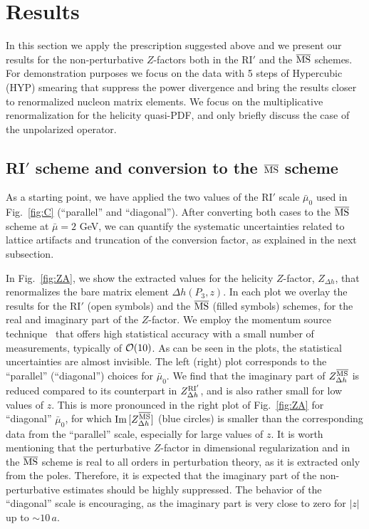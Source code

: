 \section{Results}
\label{Sec3}

In this section we apply the prescription suggested above and we present our results for the non-perturbative $Z$-factors
both in the RI$'$ and the ${\overline{\rm MS}}$ schemes. For demonstration purposes we focus on the data with 5 steps of Hypercubic (HYP) smearing that suppress
the power divergence and bring the results closer to renormalized nucleon matrix elements. We focus on the multiplicative renormalization
for the helicity quasi-PDF, and only briefly discuss the case of the unpolarized operator.

\subsection{RI$'$ scheme and conversion to the ${\overline{\rm MS}}$ scheme}

As a starting point, we have applied the two values of the RI$'$ scale $\bar\mu_0$
used in Fig.~\ref{fig:C} (``parallel'' and ``diagonal''). After converting both cases to the ${\overline{\rm MS}}$ scheme at $\bar\mu{=}2$ GeV,
we can quantify the systematic uncertainties related to lattice artifacts and truncation of the conversion factor, as explained in the next subsection.

In Fig.~\ref{fig:ZA}, we show the extracted values for the helicity $Z$-factor, $Z_{\Delta h}$, that renormalizes the bare matrix element
$\Delta h(P_3,z)$. In each plot we overlay the results for the RI$'$ (open symbols) and the ${\overline{\rm MS}}$ (filled symbols) schemes,
for the real and imaginary part of the $Z$-factor. We employ the momentum source technique~\cite{Gockeler:1998ye,Alexandrou:2015sea} that
offers high statistical accuracy with a small number of measurements, typically of ${\cal O}(10)$. As can be seen in the plots, the statistical
uncertainties are almost invisible. The left (right) plot corresponds to the ``parallel'' (``diagonal'') choices for $\bar\mu_0$.
%
We find that the imaginary part of $Z_{\Delta h}^{\overline{\rm MS}}$ is reduced compared to its counterpart in $Z_{\Delta h}^{\rm RI'}$, and is also rather small
for low values of $z$. This is more pronounced in the right plot of Fig.~\ref{fig:ZA} for ``diagonal'' $\bar\mu_0$, for which ${\rm Im}\,[Z_{\Delta h}^{{\overline{\rm MS}}}]$
(blue circles) is smaller than the corresponding data from the ``parallel'' scale, especially for large values of $z$.
It is worth mentioning that the perturbative $Z$-factor in dimensional regularization and in the ${\overline{\rm MS}}$ scheme is real to
all orders in perturbation theory, as it is extracted only from the poles. Therefore, it is expected that the imaginary part of the
non-perturbative estimates should be highly suppressed. The behavior of the ``diagonal'' scale is encouraging,
as the imaginary part is very close to zero for $|z|$ up to ${\sim}10\,a$.
\vspace*{0.25cm}

